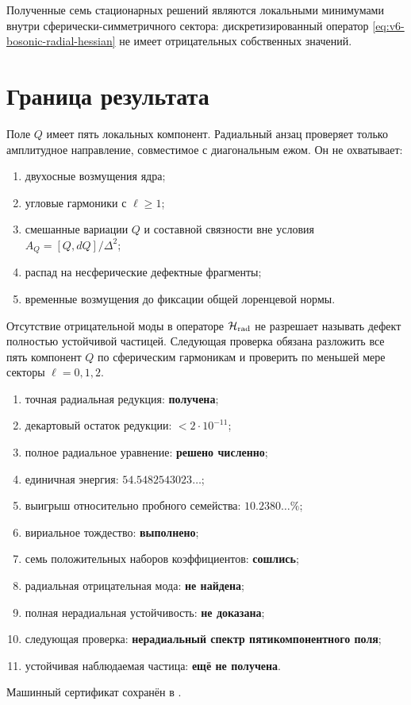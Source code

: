 \begin{proposition}
Полученные семь стационарных решений являются локальными минимумами внутри
сферически-симметричного сектора: дискретизированный оператор
\eqref{eq:v6-bosonic-radial-hessian} не имеет отрицательных собственных
значений.
\end{proposition}

\section{Граница результата}

Поле $Q$ имеет пять локальных компонент. Радиальный анзац проверяет только
амплитудное направление, совместимое с диагональным ежом. Он не охватывает:
\begin{enumerate}
 \item двухосные возмущения ядра;
 \item угловые гармоники с $\ell\ge1$;
 \item смешанные вариации $Q$ и составной связности вне условия
 $A_Q=[Q,dQ]/\Delta^2$;
 \item распад на несферические дефектные фрагменты;
 \item временные возмущения до фиксации общей лоренцевой нормы.
\end{enumerate}

\begin{nogocriterion}
Отсутствие отрицательной моды в операторе
$\mathcal H_{\rm rad}$ не разрешает называть дефект полностью устойчивой
частицей. Следующая проверка обязана разложить все пять компонент $Q$ по
сферическим гармоникам и проверить по меньшей мере секторы $\ell=0,1,2$.
\end{nogocriterion}

\begin{protocol}
\begin{enumerate}
 \item точная радиальная редукция: \textbf{получена};
 \item декартовый остаток редукции: \textbf{$<2\cdot10^{-11}$};
 \item полное радиальное уравнение: \textbf{решено численно};
 \item единичная энергия: \textbf{$54.5482543023\ldots$};
 \item выигрыш относительно пробного семейства: \textbf{$10.2380\ldots\%$};
 \item вириальное тождество: \textbf{выполнено};
 \item семь положительных наборов коэффициентов: \textbf{сошлись};
 \item радиальная отрицательная мода: \textbf{не найдена};
 \item полная нерадиальная устойчивость: \textbf{не доказана};
 \item следующая проверка: \textbf{нерадиальный спектр пятикомпонентного поля};
 \item устойчивая наблюдаемая частица: \textbf{ещё не получена}.
\end{enumerate}
\end{protocol}

Машинный сертификат сохранён в
.